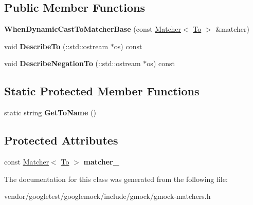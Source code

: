 \subsection*{Public Member Functions}
\begin{DoxyCompactItemize}
\item 
\mbox{\label{classtesting_1_1internal_1_1_when_dynamic_cast_to_matcher_base_a7da2a4c7c43d5e18db0a3233a601c8ab}} 
{\bfseries When\+Dynamic\+Cast\+To\+Matcher\+Base} (const \hyperlink{classtesting_1_1_matcher}{Matcher}$<$ \hyperlink{classtesting_1_1internal_1_1_to}{To} $>$ \&matcher)
\item 
\mbox{\label{classtesting_1_1internal_1_1_when_dynamic_cast_to_matcher_base_a6541f9bbcdc21e41521654c603cd2626}} 
void {\bfseries Describe\+To} (\+::std\+::ostream $\ast$os) const
\item 
\mbox{\label{classtesting_1_1internal_1_1_when_dynamic_cast_to_matcher_base_a0221de18d3b1945f8bc27fb349116564}} 
void {\bfseries Describe\+Negation\+To} (\+::std\+::ostream $\ast$os) const
\end{DoxyCompactItemize}
\subsection*{Static Protected Member Functions}
\begin{DoxyCompactItemize}
\item 
\mbox{\label{classtesting_1_1internal_1_1_when_dynamic_cast_to_matcher_base_a5950142a073ce7a1931848a958c88962}} 
static string {\bfseries Get\+To\+Name} ()
\end{DoxyCompactItemize}
\subsection*{Protected Attributes}
\begin{DoxyCompactItemize}
\item 
\mbox{\label{classtesting_1_1internal_1_1_when_dynamic_cast_to_matcher_base_a40d697407c960bee8fe3b125f5ac8730}} 
const \hyperlink{classtesting_1_1_matcher}{Matcher}$<$ \hyperlink{classtesting_1_1internal_1_1_to}{To} $>$ {\bfseries matcher\+\_\+}
\end{DoxyCompactItemize}


The documentation for this class was generated from the following file\+:\begin{DoxyCompactItemize}
\item 
vendor/googletest/googlemock/include/gmock/gmock-\/matchers.\+h\end{DoxyCompactItemize}
